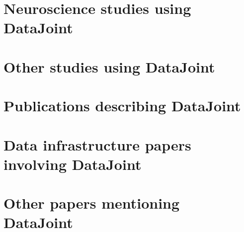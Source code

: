 \documentclass[letter,10pt]{article}
\begin{document}
\section*{Neuroscience studies using DataJoint}
\cite{aguillon2020standardized,
			angelaki2020gravity,
			baden2016functional,
			bae2021functional,
			born2021corticothalamic,
			burg2021learning,
			cadena2019deep,
			cadwell2016,
			chettih2019single,
			claudi2021innate, %
			cohrs2021investigation,
			cotton-2013,
			cotton2020factorized,
			cotton2022spatiotemporal,
			denfield2018attentional,
			ecker-2014,
			ecker2018rotation,
			erisken-2014,
			erisken2014effects,
			fahey2019global,
			franke-2017,
			franke2021behavioral,
			froudarakis_population_2014,
			heath2020circuit,
			jacobsen2021all,
			jiang_principles_2015,
			jurjut2017learning,
			khastkhodaei2016mice,
			laboratory2021standardized,
			laturnus2020systematic,
			laurens2019multiplexed,
			liu2019target,
			obenhaus2021functional,
			reimer-2016,
			reimer2014pupil,
			roson2019mouse,
			shan2016spatial,
			shan2017model,
			sinz2018stimulus,
			sinz2020simultaneous,
			spacek2019robust,
			strauss2021center,
			subramaniyan2021fear,
			urai2021citric,
			vai-2013,
			vaiceliunaite2013spatial,
			wal2021evaluating,
			walker2018inception,
			walker2019inception,
			wang2021modeling,
			yatsenko2015a,
			yatsenko2020signal,
			zhao2020temporal}

\section*{Other studies using DataJoint}
\cite{hartmann2016alternative}

\section*{Publications describing DataJoint}
\cite{singer2019,
			yatsenko-2015-datajoint,
			yatsenko-2018-datajoint,
			yatsenko-2021-datajoint}

\section*{Data infrastructure papers involving DataJoint}
\cite{bonacchi2019data}

\section*{Other papers mentioning DataJoint}
\cite{abe2021neuroscience,
			charles2020toward,
			dennis2021systems,
			hering2019slide,
			jevzek2020nwb,
			johnson2019toward,
			kohn2021flexible,
			lepperod2020experimental,
			matelsky2021integrated,
			murillo2021ndi,
			narayanan2018engineering,
			paninski2018neural,
			roson2018functional,
			sprenger2019odmltables,
			wool2020knowledge}



\end{document}
